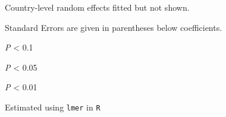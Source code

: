 \begin{table}
\begin{threeparttable}
\begin{tablenotes}
\item \scriptsize{Country-level random effects fitted but not shown.}
\item \scriptsize{Standard Errors are given in parentheses below coefficients.}
\item \scriptsize{\sym{*} \emph{P} < 0.1}
\item \scriptsize{\sym{**} \emph{P} < 0.05}
\item \scriptsize{\sym{***} \emph{P} < 0.01}
\item \scriptsize{Estimated using \texttt{lmer} in \texttt{R}}
\end{tablenotes}
\end{threeparttable}
\fontsize{10}{15}\selectfont
\end{table}